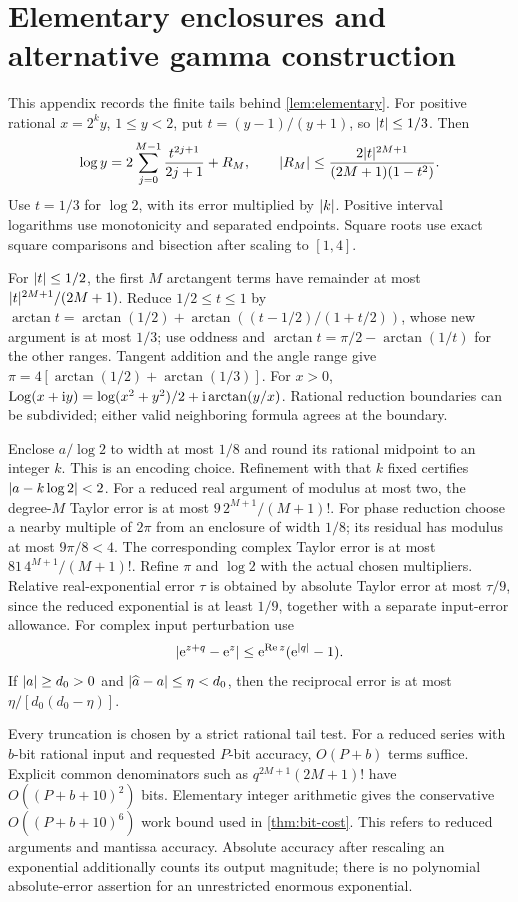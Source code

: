 \section{Elementary enclosures and alternative gamma construction}
\label{app:elementary}
This appendix records the finite tails behind \cref{lem:elementary}.
For positive rational \(x=2^ky\), \(1\le y<2\), put
\(t=(y-1)/(y+1)\), so \(\lvert t\rvert\le1/3\). Then
\begin{equation}
 \log y=2\sum_{j=0}^{M-1}\frac{t^{2j+1}}{2j+1}+R_M,
 \qquad\lvert R_M\rvert\le
 \frac{2\lvert t\rvert^{2M+1}}{(2M+1)(1-t^2)}.
 \label{eq:log-series-provider}
\end{equation}
Use \(t=1/3\) for \(\log2\), with its error multiplied by \(\lvert k\rvert\).
Positive interval logarithms use monotonicity and separated endpoints.
Square roots use exact square comparisons and bisection after scaling
to \([1,4]\).

For \(\lvert t\rvert\le1/2\), the first \(M\) arctangent terms have
remainder at most \(\lvert t\rvert^{2M+1}/(2M+1)\). Reduce
\(1/2\le t\le1\) by
\(\arctan t=\arctan(1/2)+\arctan((t-1/2)/(1+t/2))\),
whose new argument is at most \(1/3\); use oddness and
\(\arctan t=\pi/2-\arctan(1/t)\) for the other ranges.
Tangent addition and the angle range give
\(\pi=4[\arctan(1/2)+\arctan(1/3)]\).
For \(x>0\),
\(\operatorname{Log}(x+\mathrm i y)=\log(x^2+y^2)/2+\mathrm i\arctan(y/x)\).
Rational reduction boundaries can be subdivided; either valid neighboring
formula agrees at the boundary.

Enclose \(a/\log2\) to width at most \(1/8\) and round its rational
midpoint to an integer \(k\). This is an encoding choice. Refinement
with that \(k\) fixed certifies \(\lvert a-k\log2\rvert<2\).
For a reduced real argument of modulus at most two, the degree-\(M\)
Taylor error is at most \(9\,2^{M+1}/(M+1)!\).
For phase reduction choose a nearby multiple of \(2\pi\) from an
enclosure of width \(1/8\); its residual has modulus at most
\(9\pi/8<4\). The corresponding complex Taylor error is at most
\(81\,4^{M+1}/(M+1)!\).
Refine \(\pi\) and \(\log2\) with the actual chosen multipliers.
Relative real-exponential error \(\tau\) is obtained by absolute
Taylor error at most \(\tau/9\), since the reduced exponential
is at least \(1/9\), together with a separate input-error allowance.
For complex input perturbation use
\[
 \lvert \mathrm e^{z+q}-\mathrm e^z\rvert\le\mathrm e^{\operatorname{Re} z}(\mathrm e^{\lvert q\rvert}-1).
\]
If \(\lvert a\rvert\ge d_0>0\) and \(\lvert \widehat a-a\rvert\le\eta<d_0\),
then the reciprocal error is at most \(\eta/[d_0(d_0-\eta)]\).

Every truncation is chosen by a strict rational tail test. For a reduced
series with \(b\)-bit rational input and requested \(P\)-bit accuracy,
\(O(P+b)\) terms suffice. Explicit common denominators such as
\(q^{2M+1}(2M+1)!\) have \(O((P+b+10)^2)\) bits.
Elementary integer arithmetic gives the conservative
\(O((P+b+10)^6)\) work bound used in \cref{thm:bit-cost}.
This refers to reduced arguments and mantissa accuracy. Absolute
accuracy after rescaling an exponential additionally counts its output
magnitude; there is no polynomial absolute-error assertion for an
unrestricted enormous exponential.

